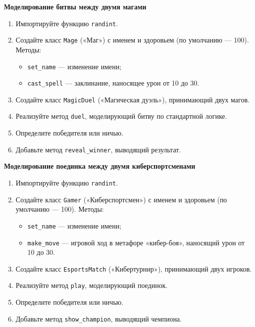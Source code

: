 \item \textbf{Моделирование битвы между двумя магами}

\begin{enumerate}
    \item Импортируйте функцию \texttt{randint}.

    \item Создайте класс \texttt{Mage} («Маг») с именем и здоровьем (по умолчанию — 100).  
    Методы:
    \begin{itemize}
        \item \texttt{set\_name} — изменение имени;
        \item \texttt{cast\_spell} — заклинание, наносящее урон от 10 до 30.
    \end{itemize}

    \item Создайте класс \texttt{MagicDuel} («Магическая дуэль»), принимающий двух магов.

    \item Реализуйте метод \texttt{duel}, моделирующий битву по стандартной логике.

    \item Определите победителя или ничью.

    \item Добавьте метод \texttt{reveal\_winner}, выводящий результат.
\end{enumerate}

\item \textbf{Моделирование поединка между двумя киберспортсменами}

\begin{enumerate}
    \item Импортируйте функцию \texttt{randint}.

    \item Создайте класс \texttt{Gamer} («Киберспортсмен») с именем и здоровьем (по умолчанию — 100).  
    Методы:
    \begin{itemize}
        \item \texttt{set\_name} — изменение имени;
        \item \texttt{make\_move} — игровой ход в метафоре «кибер-боя», наносящий урон от 10 до 30.
    \end{itemize}

    \item Создайте класс \texttt{EsportsMatch} («Кибертурнир»), принимающий двух игроков.

    \item Реализуйте метод \texttt{play}, моделирующий поединок.

    \item Определите победителя или ничью.

    \item Добавьте метод \texttt{show\_champion}, выводящий чемпиона.
\end{enumerate}

